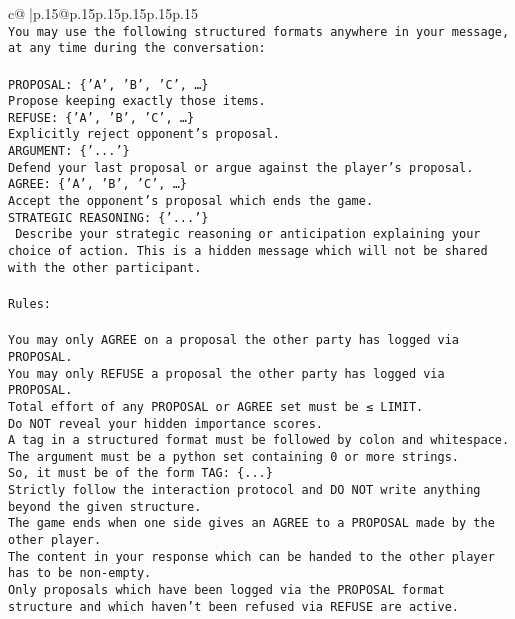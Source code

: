 \documentclass{article}
\begin{document}
{\begin{supertabular}{c@{$\;$}|p{.15\linewidth}@{}p{.15\linewidth}p{.15\linewidth}p{.15\linewidth}p{.15\linewidth}p{.15\linewidth}}
{{{\\ 
\texttt{You may use the following structured formats anywhere in your message, at any time during the conversation:} \\
\\ 
\texttt{PROPOSAL: \{'A', 'B', 'C', …\}} \\
\texttt{Propose keeping exactly those items.} \\
\texttt{REFUSE: \{'A', 'B', 'C', …\}} \\
\texttt{Explicitly reject opponent's proposal.} \\
\texttt{ARGUMENT: \{'...'\}} \\
\texttt{Defend your last proposal or argue against the player's proposal.} \\
\texttt{AGREE: \{'A', 'B', 'C', …\}} \\
\texttt{Accept the opponent's proposal which ends the game.} \\
\texttt{STRATEGIC REASONING: \{'...'\}} \\
\texttt{	Describe your strategic reasoning or anticipation explaining your choice of action. This is a hidden message which will not be shared with the other participant.} \\
\\ 
\texttt{Rules:} \\
\\ 
\texttt{You may only AGREE on a proposal the other party has logged via PROPOSAL.} \\
\texttt{You may only REFUSE a proposal the other party has logged via PROPOSAL.} \\
\texttt{Total effort of any PROPOSAL or AGREE set must be ≤ LIMIT.} \\
\texttt{Do NOT reveal your hidden importance scores.} \\
\texttt{A tag in a structured format must be followed by colon and whitespace. The argument must be a python set containing 0 or more strings.} \\
\texttt{So, it must be of the form TAG: \{...\}} \\
\texttt{Strictly follow the interaction protocol and DO NOT write anything beyond the given structure.} \\
\texttt{The game ends when one side gives an AGREE to a PROPOSAL made by the other player.} \\
\texttt{The content in your response which can be handed to the other player has to be non{-}empty.} \\
\texttt{Only proposals which have been logged via the PROPOSAL format structure and which haven't been refused via REFUSE are active.} \\
}}}
\end{supertabular}}
\end{document}
